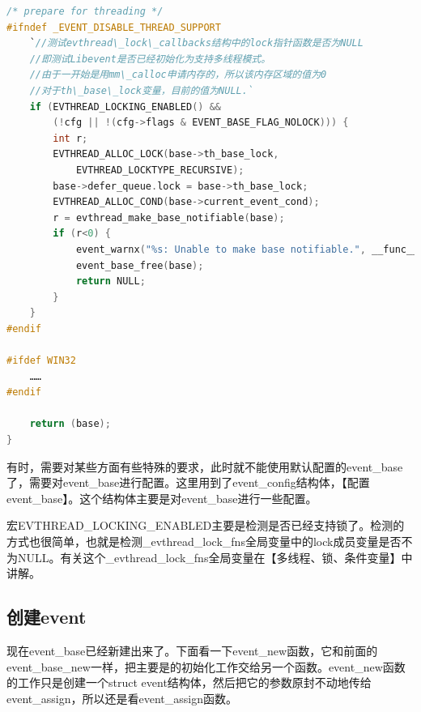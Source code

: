 \documentclass[11pt,a4paper]{article}
\begin{document}
\begin{lstlisting}[language=C]
	/* prepare for threading */
#ifndef _EVENT_DISABLE_THREAD_SUPPORT
	`//测试evthread\_lock\_callbacks结构中的lock指针函数是否为NULL
	//即测试Libevent是否已经初始化为支持多线程模式。
	//由于一开始是用mm\_calloc申请内存的，所以该内存区域的值为0
	//对于th\_base\_lock变量，目前的值为NULL.`
	if (EVTHREAD_LOCKING_ENABLED() &&
	    (!cfg || !(cfg->flags & EVENT_BASE_FLAG_NOLOCK))) {
		int r;
		EVTHREAD_ALLOC_LOCK(base->th_base_lock,
		    EVTHREAD_LOCKTYPE_RECURSIVE);
		base->defer_queue.lock = base->th_base_lock;
		EVTHREAD_ALLOC_COND(base->current_event_cond);
		r = evthread_make_base_notifiable(base);
		if (r<0) {
			event_warnx("%s: Unable to make base notifiable.", __func__);
			event_base_free(base);
			return NULL;
		}
	}
#endif

#ifdef WIN32
	……
#endif

	return (base);
}
\end{lstlisting}
有时，需要对某些方面有些特殊的要求，此时就不能使用默认配置的event\_base了，需要对event\_base进行配置。这里用到了event\_config结构体，【配置event\_base】。这个结构体主要是对event\_base进行一些配置。

宏EVTHREAD\_LOCKING\_ENABLED主要是检测是否已经支持锁了。检测的方式也很简单，也就是检测\_evthread\_lock\_fns全局变量中的lock成员变量是否不为NULL。有关这个\_evthread\_lock\_fns全局变量在【多线程、锁、条件变量】中讲解。

\subsection{创建event}
现在event\_base已经新建出来了。下面看一下event\_new函数，它和前面的event\_base\_new一样，把主要是的初始化工作交给另一个函数。event\_new函数的工作只是创建一个struct event结构体，然后把它的参数原封不动地传给event\_assign，所以还是看event\_assign函数。
\end{document}

